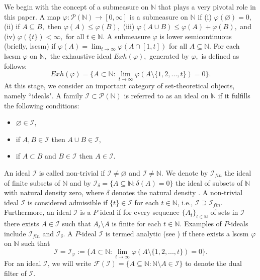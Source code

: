 \documentclass[reqno]{amsart}
\begin{document}
	We begin with the concept of a submeasure on $\mathbb{N}$ that plays a very pivotal role in this paper. A map $\varphi:\mathcal{P}(\mathbb{N})\to [0,\infty]$ is a submeasure on $\mathbb{N}$ if (i) $\varphi(\varnothing)=0,$ (ii)	if $A\subseteq B,$ then $\varphi(A)\leq \varphi(B),$ (iii)	 $\varphi(A\cup B)\leq \varphi(A)+\varphi(B),$ and (iv) $\varphi(\{t\})<\infty,$ for all $t\in\mathbb{N}.$ A  submeasure  $\varphi$ is  lower semicontinuous   (briefly, lscsm) if $\varphi(A)=\displaystyle\lim_{t\to\infty}\varphi(A\cap[1,t])$ for all $A\subseteq\mathbb{N}.$
	For each lscsm $\varphi$ on $\mathbb{N},$ the exhaustive ideal $Exh(\varphi),$ generated by $\varphi,$ is defined as follows: 
	\begin{equation*}
		Exh(\varphi)=\{A\subset \mathbb{N}:\lim_{t\to\infty}\varphi(A\setminus\{1,2,...,t\})=0\}.
	\end{equation*}
At this stage, we consider an important category of set-theoretical objects, namely ``ideals".
A family $\mathcal{I}\subset\mathcal{P}(\mathbb{N})$ is referred to as an ideal \cite{kostyrko2000convergence} on $\mathbb{N}$ if it fulfills the following conditions:
\begin{itemize}
	\item $\varnothing\in\mathcal{I}$,
	\item if $A,B\in \mathcal{I}$ then $A\cup B\in\mathcal{I}$,
	\item if $A\subset B$ and $B\in\mathcal{I}$ then $A\in \mathcal{I}$.
\end{itemize}
An ideal $\mathcal{I}$ is called non-trivial if $\mathcal{I}\neq\varnothing$ and $\mathcal{I}\neq\mathbb{N}$. We denote by $\mathcal{I}_{fin}$ the ideal of finite subsets of $\mathbb{N}$ and by $\mathcal{I}_\delta=\{A\subseteq \mathbb{N}: \delta(A)=0\}$ the ideal of subsets of $\mathbb{N}$ with natural density zero, where $\delta$ denotes the natural density  \cite{fast1951convergence, fridy1985statistical, vsalat1980statistically}. A non-trivial ideal $\mathcal{I}$ is considered admissible if $\{t\}\in\mathcal{I}$ for each $t\in\mathbb{N}$, i.e., $\mathcal{I}\supseteq \mathcal{I}_{fin}$. %
Furthermore, an ideal $\mathcal{I}$ is a $P$-ideal \cite{kostyrko2000convergence} if for every sequence $\{A_t\}_{t\in\mathbb{N}}$ of sets in $\mathcal{I}$ there exists  $A\in\mathcal{I}$ such that  $A_t\setminus A$ is finite for each $t\in\mathbb{N}.$ Examples of $P$-ideals include $\mathcal{I}_{fin}$ and $\mathcal{I}_\delta$. A $P$-ideal $\mathcal{I}$ is termed analytic (see \cite{solecki}) if there exists a lscsm $\varphi$ on $\mathbb{N}$ such that
$$
\mathcal{I}=\mathcal{I}_{\varphi}:=\{A\subset\mathbb{N}:\lim_{t\to\infty}\varphi(A\setminus \{1,2,...,t\})=0\}.
$$
 For an ideal $\mathcal{I}$, we will write $\mathcal{F}(\mathcal{I})=\{A\subseteq\mathbb{N}:\mathbb{N}\setminus A\in\mathcal{I}\}$ to denote the dual filter of $\mathcal{I}$.\\
\end{document}
